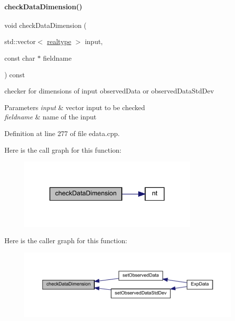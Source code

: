 \paragraph{\texorpdfstring{check\+Data\+Dimension()}{checkDataDimension()}}
{\footnotesize\ttfamily void check\+Data\+Dimension (\begin{DoxyParamCaption}\item[{std\+::vector$<$ \mbox{\hyperlink{namespaceamici_a1bdce28051d6a53868f7ccbf5f2c14a3}{realtype}} $>$}]{input,  }\item[{const char $\ast$}]{fieldname }\end{DoxyParamCaption}) const\hspace{0.3cm}{\ttfamily [protected]}}

checker for dimensions of input observed\+Data or observed\+Data\+Std\+Dev


\begin{DoxyParams}{Parameters}
{\em input} & vector input to be checked \\
\hline
{\em fieldname} & name of the input \\
\hline
\end{DoxyParams}


Definition at line 277 of file edata.\+cpp.

Here is the call graph for this function\+:
\nopagebreak
\begin{figure}[H]
\begin{center}
\leavevmode
\includegraphics[width=255pt]{classamici_1_1_exp_data_acad115e928a8b0bc8e90ebf9553d3eed_cgraph}
\end{center}
\end{figure}
Here is the caller graph for this function\+:
\nopagebreak
\begin{figure}[H]
\begin{center}
\leavevmode
\includegraphics[width=350pt]{classamici_1_1_exp_data_acad115e928a8b0bc8e90ebf9553d3eed_icgraph}
\end{center}
\end{figure}
\mbox{\label{classamici_1_1_exp_data_adcf5587f972fdef595fff78123f5118a}} 
